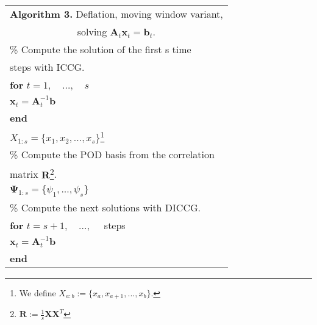 \documentclass[times,final]{elsarticle}
\begin{document}
\begin{minipage}{0.45\textwidth}
\vspace{0.2cm}
\begin{tabular}{ |l | } 
\hline
\multicolumn{1}{|c|}{\textbf{Algorithm 3.} Deflation, moving window variant,}\\
\multicolumn{1}{|c|}{ solving $\mathbf{A}_t\mathbf{x}_t=\mathbf{b}_t$.}\\
\hline
\footnotesize\% Compute the solution of the first s time\\ \footnotesize  steps with {ICCG}. \\
\hspace{0.5cm}\textbf{for} $t=1,\quad ...,\quad s$ \\
\hspace{1cm}$\mathbf{x}_t=\mathbf{A}_t^{-1}\mathbf{b}$\\
\hspace{0.5cm}\textbf{end}\\
\hspace{0.5cm}$X_{1:s}=\{x_1,x_2,...,x_{s}\}$\footnote{We define $X_{a:b}:=\{x_a,x_{a+1},...,x_{b}\}$.}  \\ 
\footnotesize \% Compute the POD basis from the correlation \\
\footnotesize matrix $\mathbf{R}$\footnote{$\mathbf{R}:= \frac{1}{s}\mathbf{X}\mathbf{X}^T$}. \\
\hspace{1cm}$\mathbf{\Psi}_{1:s}= \{\psi_{1}, ... ,\psi_{s}\}$\\ 
\footnotesize \% Compute the next solutions with {DICCG}.\\
\hspace{0.5cm}\textbf{for} $t=s+1,\quad ...,\quad$ steps\\
\hspace{1cm}$\mathbf{x}_t=\mathbf{A}_t^{-1}\mathbf{b}$\\
\hspace{0.5cm}\textbf{end}\\
\hline
\end{tabular} 
\end{minipage}%
\hspace{0.5cm}
\end{document}
